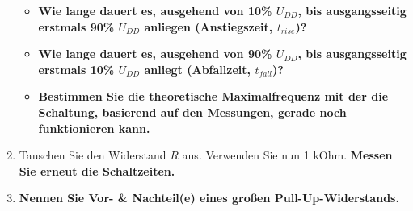 \documentclass[10pt]{scrreprt}
\begin{document}
\begin{enumerate}
\begin{itemize}
                \item \textbf{
                        Wie lange dauert es, ausgehend von 10\% $U_{DD}$, bis ausgangsseitig
                        erstmals 90\% $U_{DD}$ anliegen (Anstiegszeit, $t_{rise}$)?
                    }
                \item \textbf{
                        Wie lange dauert es, ausgehend von 90\% $U_{DD}$, bis ausgangsseitig
                        erstmals 10\% $U_{DD}$ anliegt (Abfallzeit, $t_{fall}$)?
                    }
                \item \textbf{
                        Bestimmen Sie die theoretische Maximalfrequenz mit der die Schaltung,
                        basierend auf den Messungen, gerade noch funktionieren kann.
                    }
            \end{itemize}
        \item Tauschen Sie den Widerstand $R$ aus. Verwenden Sie nun 1 kOhm. \textbf{Messen Sie
            erneut die Schaltzeiten.}
        \item \textbf{
                Nennen Sie Vor- \& Nachteil(e) eines großen Pull-Up-Widerstands.
                }
    \end{enumerate}
\end{document}
